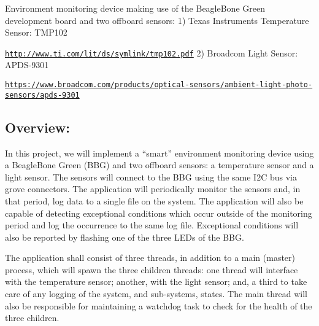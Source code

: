 Environment monitoring device making use of the Beagle\+Bone Green development board and two offboard sensors\+: 1) Texas Instruments Temperature Sensor\+: T\+M\+P102

\href{http://www.ti.com/lit/ds/symlink/tmp102.pdf}{\tt http\+://www.\+ti.\+com/lit/ds/symlink/tmp102.\+pdf} 2) Broadcom Light Sensor\+: A\+P\+D\+S-\/9301

\href{https://www.broadcom.com/products/optical-sensors/ambient-light-photo-sensors/apds-9301}{\tt https\+://www.\+broadcom.\+com/products/optical-\/sensors/ambient-\/light-\/photo-\/sensors/apds-\/9301}

\subsection*{Overview\+:}

In this project, we will implement a “smart” environment monitoring device using a Beagle\+Bone Green (B\+BG) and two offboard sensors\+: a temperature sensor and a light sensor. The sensors will connect to the B\+BG using the same I2C bus via grove connectors. The application will periodically monitor the sensors and, in that period, log data to a single file on the system. The application will also be capable of detecting exceptional conditions which occur outside of the monitoring period and log the occurrence to the same log file. Exceptional conditions will also be reported by flashing one of the three L\+E\+Ds of the B\+BG.

The application shall consist of three threads, in addition to a main (master) process, which will spawn the three children threads\+: one thread will interface with the temperature sensor; another, with the light sensor; and, a third to take care of any logging of the system, and sub-\/systems, states. The main thread will also be responsible for maintaining a watchdog task to check for the health of the three children. 